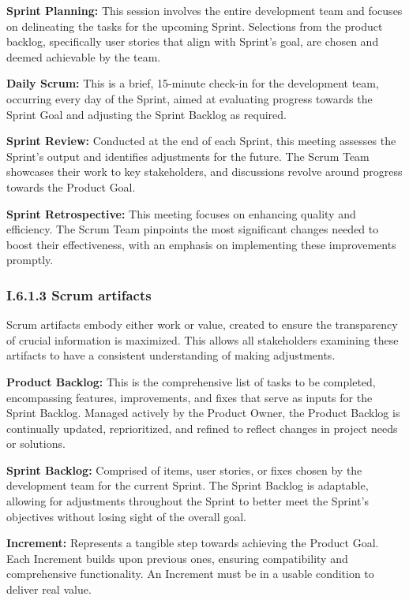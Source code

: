 \textbf{Sprint Planning:} This session involves the entire development team and focuses on delineating the tasks for the upcoming Sprint. Selections from the product backlog, specifically user stories that align with Sprint’s goal, are chosen and deemed achievable by the team.

\textbf{Daily Scrum:} This is a brief, 15-minute check-in for the development team, occurring every day of the Sprint, aimed at evaluating progress towards the Sprint Goal and adjusting the Sprint Backlog as required.

\textbf{Sprint Review:} Conducted at the end of each Sprint, this meeting assesses the Sprint’s output and identifies adjustments for the future. The Scrum Team showcases their work to key stakeholders, and discussions revolve around progress towards the Product Goal.

\textbf{Sprint Retrospective:} This meeting focuses on enhancing quality and efficiency. The Scrum Team pinpoints the most significant changes needed to boost their effectiveness, with an emphasis on implementing these improvements promptly.

\subsubsection*{I.6.1.3  Scrum artifacts}

Scrum artifacts embody either work or value, created to ensure the transparency of crucial information is maximized. This allows all stakeholders examining these artifacts to have a consistent understanding of making adjustments.

\textbf{Product Backlog:} This is the comprehensive list of tasks to be completed, encompassing features, improvements, and fixes that serve as inputs for the Sprint Backlog. Managed actively by the Product Owner, the Product Backlog is continually updated, reprioritized, and refined to reflect changes in project needs or solutions.

\textbf{Sprint Backlog:} Comprised of items, user stories, or fixes chosen by the development team for the current Sprint. The Sprint Backlog is adaptable, allowing for adjustments throughout the Sprint to better meet the Sprint’s objectives without losing sight of the overall goal.

\textbf{Increment:} Represents a tangible step towards achieving the Product Goal. Each Increment builds upon previous ones, ensuring compatibility and comprehensive functionality. An Increment must be in a usable condition to deliver real value.

